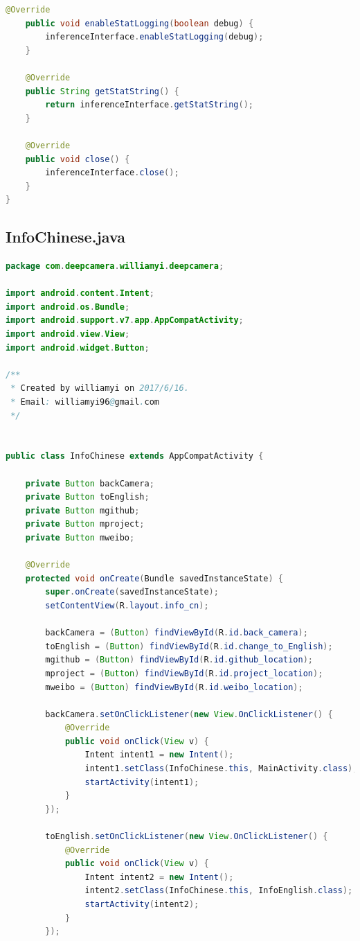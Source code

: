 \documentclass[UTF8, Microsoft YaHei]{book}
\begin{document}
\begin{small}
\begin{lstlisting}[language=java]
    @Override
    public void enableStatLogging(boolean debug) {
        inferenceInterface.enableStatLogging(debug);
    }

    @Override
    public String getStatString() {
        return inferenceInterface.getStatString();
    }

    @Override
    public void close() {
        inferenceInterface.close();
    }
}
\end{lstlisting}
\end{small}
    \subsection{InfoChinese.java}
\begin{small}
\begin{lstlisting}[language=java]
package com.deepcamera.williamyi.deepcamera;

import android.content.Intent;
import android.os.Bundle;
import android.support.v7.app.AppCompatActivity;
import android.view.View;
import android.widget.Button;

/**
 * Created by williamyi on 2017/6/16.
 * Email: williamyi96@gmail.com
 */


public class InfoChinese extends AppCompatActivity {

    private Button backCamera;
    private Button toEnglish;
    private Button mgithub;
    private Button mproject;
    private Button mweibo;

    @Override
    protected void onCreate(Bundle savedInstanceState) {
        super.onCreate(savedInstanceState);
        setContentView(R.layout.info_cn);

        backCamera = (Button) findViewById(R.id.back_camera);
        toEnglish = (Button) findViewById(R.id.change_to_English);
        mgithub = (Button) findViewById(R.id.github_location);
        mproject = (Button) findViewById(R.id.project_location);
        mweibo = (Button) findViewById(R.id.weibo_location);

        backCamera.setOnClickListener(new View.OnClickListener() {
            @Override
            public void onClick(View v) {
                Intent intent1 = new Intent();
                intent1.setClass(InfoChinese.this, MainActivity.class);
                startActivity(intent1);
            }
        });

        toEnglish.setOnClickListener(new View.OnClickListener() {
            @Override
            public void onClick(View v) {
                Intent intent2 = new Intent();
                intent2.setClass(InfoChinese.this, InfoEnglish.class);
                startActivity(intent2);
            }
        });


\end{lstlisting}
\end{small}
\end{document}
